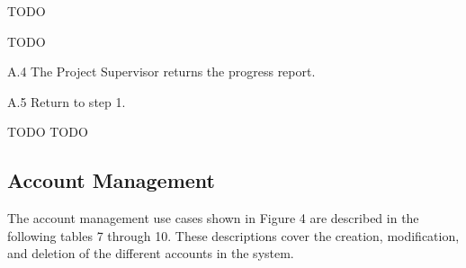 \begin{table}
  \centering
  \caption{TODO}
  \label{tbl:use-case-TODO}

  \begin{usecase}[TODO]
    \ucnormal
    \begin{ucenum}
      \item TODO
    \end{ucenum}
    \begin{ucenum}
      \item [A.4] The Project Supervisor returns the progress report.
      \item [A.5] Return to step 1.
    \end{ucenum}
    TODO
    TODO
  \end{usecase}
\end{table}


\FloatBarrier

\subsection{Account Management}

The account management use cases shown in Figure 4 are described in the following tables 7 through 10. These descriptions cover the creation, modification, and deletion of the different accounts in the system.
